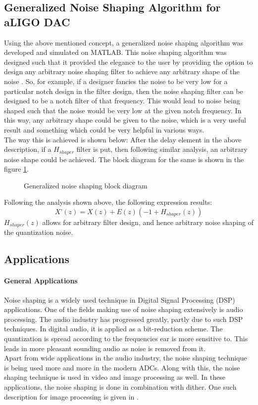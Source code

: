 \documentclass[colorlinks=true,pdfstartview=FitV,linkcolor=blue,
            citecolor=red,urlcolor=magenta]{ligodoc}
\begin{document}
	\subsection{Generalized Noise Shaping Algorithm for aLIGO DAC}
	Using the above mentioned concept, a generalized noise shaping algorithm was developed and simulated on MATLAB. This noise shaping algorithm was designed such that it provided the elegance to the user by providing the option to design any arbitrary noise shaping filter to achieve any arbitrary shape of the noise \cite{Nentwig}. So, for example, if a designer fancies the noise to be very low for a particular notch design in the filter design, then the noise shaping filter can be designed to be a notch filter of that frequency. This would lead to noise being shaped such that the noise would be very low at the given notch frequency. In this way, any arbitrary shape could be given to the noise, which is a very useful result and something which could be very helpful in various ways. \\The way this is achieved is shown below:
	After the delay element in the above description, if a $H_{shaper}$ filter is put, then following similar analysis, an arbitrary noise shape could be achieved. The block diagram for the same is shown in the figure \ref{shaper}.
	\begin{figure}[H]

  		\centering
		\def\svgscale{0.5}
  		\tiny{
  		
  		}
  		\caption{Generalized noise shaping block diagram}
		\label{shaper}
	\end{figure}
	Following the analysis shown above, the following expression results: \\
	\begin{equation}
	X’(z) = X(z) + E(z) (-1 + H_{shaper}(z))
	\end{equation}
	$H_{shaper}(z)$ allows for arbitrary filter design, and hence arbitrary noise shaping of the quantization noise.
    \subsection{Applications}
    		\paragraph{General Applications} Noise shaping is a widely used technique in Digital Signal Processing (DSP) applications. One of the fields making use of noise shaping extensively is audio processing. The audio industry has progressed greatly, partly due to such DSP techniques. In digital audio, it is applied as a bit-reduction scheme. The quantization is spread according to the frequencies ear is more sensitive to. This leads in more pleasant sounding audio as noise is removed from it. \\
    		Apart from wide applications in the audio industry, the noise shaping technique is being used more and more in the modern ADCs. Along with this, the noise shaping technique is used in video and image processing as well. In these applications, the noise shaping is done in combination with dither. One such description for image processing is given in \cite{Christou}. 
\end{document}
